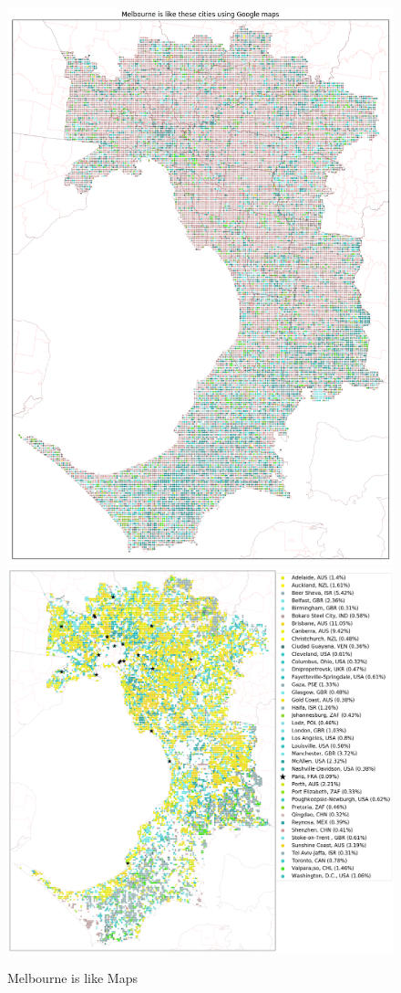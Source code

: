 \documentclass[final,3p,times,authoryear]{elsarticle}
\begin{document}
\begin{figure}[!htbp]
\centering    
\includegraphics[scale=0.25]{Images/MelbourneOverall_maps.png} 
\includegraphics[scale=0.25]{Images/MelbourneOverallAbrev_maps.png} 
\caption{Melbourne is like Maps}    
 \label{fig:melmaps}  
\end{figure} 
\end{document}
